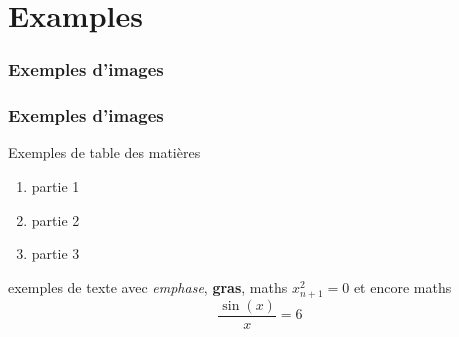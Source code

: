 \section{Examples}
 
 \begin{frame}
  \frametitle{Exemples d'images}
 \end{frame}
 
 \begin{frame}
  \frametitle{Exemples d'images}
 \end{frame}
 \begin{frame}
   Exemples de table des matières

 \begin{enumerate}


   \item partie 1
   \item partie 2
   \item partie 3
   
 \end{enumerate}

 
 \end{frame} 
 
 \begin{frame}
 exemples de texte avec \emph{emphase}, \textbf{gras}, maths $x_{n+1}^2=0$ et encore maths
 \[
 \frac{\sin(x)}{x} = 6
 \]
 \end{frame}
